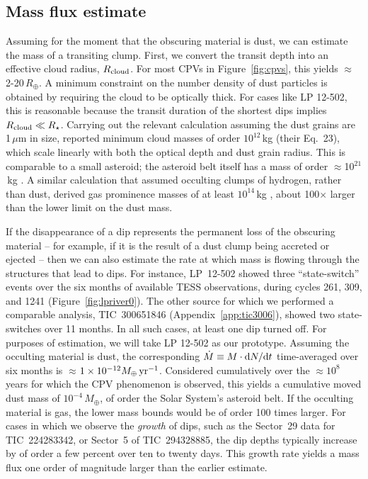 \documentclass[11pt,twocolumn,tighten,linenumbers]{aastex63}
\begin{document}
\subsection{Mass flux estimate}
\label{subsec:massflux}

Assuming for the moment that the obscuring material is dust, we can
estimate the mass of a transiting clump. First, we convert the transit
depth into an effective cloud radius, $R_{\rm cloud}$.  For most CPVs
in Figure~\ref{fig:cpvs}, this yields $\approx$2-20\,$R_\oplus$.  A
minimum constraint on the number density of dust particles is obtained
by requiring the cloud to be optically thick.  For cases like LP
12-502, this is reasonable because the transit duration of the
shortest dips implies $R_{\rm cloud}\ll R_\star$.  Carrying out the
relevant calculation assuming the dust grains are 1\,$\mu$m in size,
\citet{2023MNRAS.518.4734S} reported minimum cloud masses of order
$10^{12}$\,kg (their Eq.~23), which scale linearly with both the
optical depth and dust grain radius.  This is comparable to a small
asteroid; the asteroid belt itself has a mass of order
$\approx$10$^{21}$\,kg \citep{2019Icar..319..812P}.  A similar
calculation that assumed occulting clumps of hydrogen, rather than
dust, derived gas prominence masses of at least $10^{14}$\,kg
\citep{1990MNRAS.247..415C}, about 100$\times$ larger than the lower
limit on the dust mass.

If the disappearance of a dip represents the permanent loss of the
obscuring material -- for example, if it is the result of a dust clump
being accreted or ejected -- then we can also estimate the rate at
which mass is flowing through the structures that lead to dips.  For
instance, LP~12-502 showed three ``state-switch'' events over the six
months of available TESS observations, during cycles 261, 309, and
1241 (Figure~\ref{fig:lpriver0}).  The other source for which we
performed a comparable analysis, TIC~300651846
(Appendix~\ref{app:tic3006}), showed two state-switches over 11
months.  In all such cases, at least one dip turned off.  For purposes
of estimation, we will take LP 12-502 as our prototype.  Assuming the
occulting material is dust, the corresponding $\dot{M} \equiv M\cdot
{\rm d}N/{\rm d}t$ time-averaged over six months is
$\approx$$1\times10^{-12} M_\oplus\,{\rm yr}^{-1}$.  Considered
cumulatively over the $\approx$$10^8$ years for which the CPV
phenomenon is observed, this yields a cumulative moved dust mass of
$10^{-4}\,M_\oplus$, of order the Solar System's asteroid belt.  If
the occulting material is gas, the lower mass bounds would be of order
100 times larger.  For cases in which we observe the {\it growth} of
dips, such as the Sector~29 data for TIC~224283342, or Sector~5 of
TIC~294328885, the dip depths typically increase by of order a few
percent over ten to twenty days.  This growth rate yields a mass flux
one order of magnitude larger than the earlier estimate.
\end{document}
